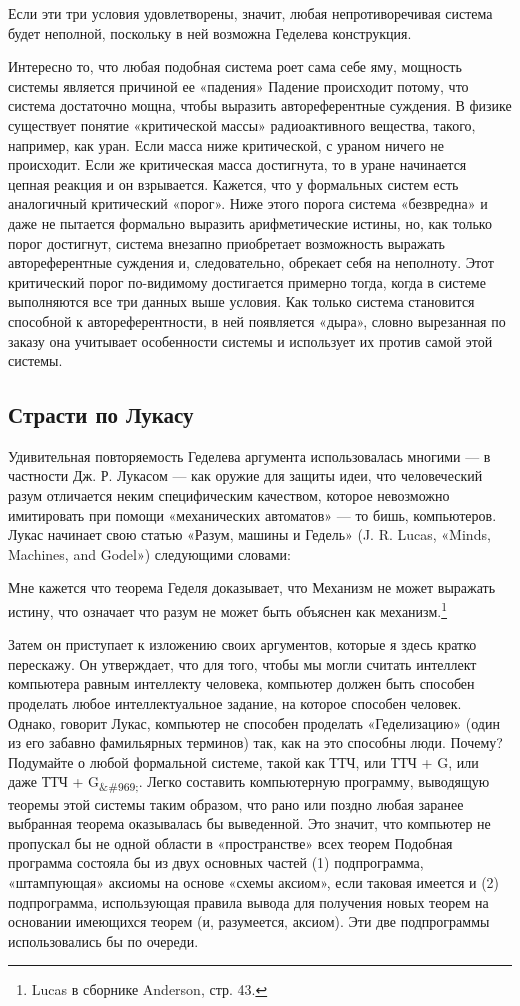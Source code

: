 \documentclass[../main.tex]{subfiles}
\begin{document}
Если эти три условия удовлетворены, значит, любая непротиворечивая система будет неполной, поскольку в ней возможна Геделева конструкция.

Интересно то, что любая подобная система роет сама себе яму, мощность системы является причиной ее «падения» Падение происходит потому, что система достаточно мощна, чтобы выразить автореферентные суждения. В физике существует понятие «критической массы» радиоактивного вещества, такого, например, как уран. Если масса ниже критической, с ураном ничего не происходит. Если же критическая масса достигнута, то в уране начинается цепная реакция и он взрывается. Кажется, что у формальных систем есть аналогичный критический «порог». Ниже этого порога система «безвредна» и даже не пытается формально выразить арифметические истины, но, как только порог достигнут, система внезапно приобретает возможность выражать автореферентные суждения и, следовательно, обрекает себя на неполноту. Этот критический порог по-видимому достигается примерно тогда, когда в системе выполняются все три данных выше условия. Как только система становится способной к автореферентности, в ней появляется «дыра», словно вырезанная по заказу она учитывает особенности системы и использует их против самой этой системы.


\subsection{Страсти по Лукасу}

Удивительная повторяемость Геделева аргумента использовалась многими --- в частности Дж. Р. Лукасом --- как оружие для защиты идеи, что человеческий разум отличается неким специфическим качеством, которое невозможно имитировать при помощи «механических автоматов» --- то бишь, компьютеров. Лукас начинает свою статью «Разум, машины и Гедель» (J. R. Lucas, «Minds, Machines, and Godel») следующими словами:

Мне кажется что теорема Геделя доказывает, что Механизм не может выражать истину, что означает что разум не может быть объяснен как механизм.\footnote{Lucas в сборнике Anderson, стр. 43.}

Затем он приступает к изложению своих аргументов, которые я здесь кратко перескажу. Он утверждает, что для того, чтобы мы могли считать интеллект компьютера равным интеллекту человека, компьютер должен быть способен проделать любое интеллектуальное задание, на которое способен человек. Однако, говорит Лукас, компьютер не способен проделать «Геделизацию» (один из его забавно фамильярных терминов) так, как на это способны люди. Почему? Подумайте о любой формальной системе, такой как ТТЧ, или ТТЧ + G, или даже ТТЧ + G\textsubscript{\&\#969;}. Легко составить компьютерную программу, выводящую теоремы этой системы таким образом, что рано или поздно любая заранее выбранная теорема оказывалась бы выведенной. Это значит, что компьютер не пропускал бы не одной области в «пространстве» всех теорем Подобная программа состояла бы из двух основных частей (1) подпрограмма, «штампующая» аксиомы на основе «схемы аксиом», если таковая имеется и (2) подпрограмма, использующая правила вывода для получения новых теорем на основании имеющихся теорем (и, разумеется, аксиом). Эти две подпрограммы использовались бы по очереди.
\end{document}
